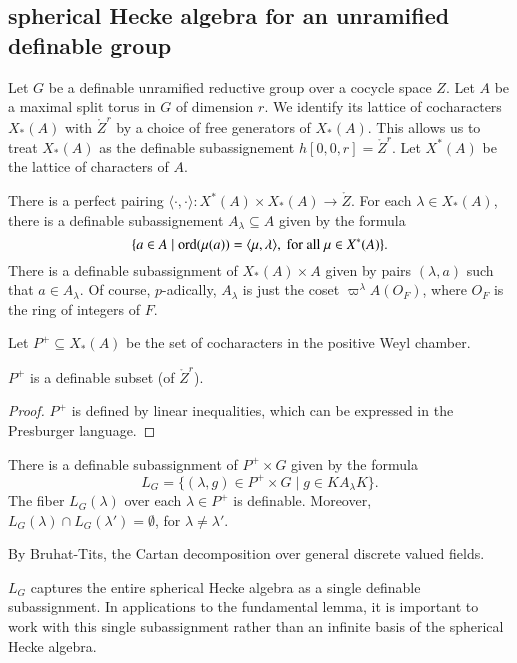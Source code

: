 \subsection{spherical Hecke algebra for an unramified definable group}

Let $G$ be a definable unramified reductive group over a cocycle space
$Z$.  Let $A$ be a maximal split torus in $G$ of dimension $r$.  We
identify its lattice of cocharacters $X_*(A)$ with $\ring{Z}^r$ by a
choice of free generators of $X_*(A)$.  This allows us to treat
$X_*(A)$ as the definable subassignement $h[0,0,r] = \ring{Z}^r$.  Let
$X^*(A)$ be the lattice of characters of $A$.

There is a perfect pairing $\langle\cdot,\cdot\rangle:X^*(A)\times
X_*(A) \to \ring{Z}$.  For each $\lambda\in X_*(A)$, there is a
definable subassignement $A_\lambda \subseteq A$ given by the formula
\[
\{ a \in A \mid {\operatorname{ord}}(\mu(a)) 
= \langle{\mu,\lambda}\rangle,\text{ for all } \mu\in X^*(A) \}.
\]
There is a definable subassignment of $X_*(A)\times A$ given by pairs
$(\lambda,a)$ such that $a\in A_\lambda$.  Of course, $p$-adically,
$A_\lambda$ is just the coset $\varpi^\lambda A(O_F)$, where $O_F$ is
the ring of integers of $F$.

Let $P^+\subseteq X_*(A)$ be the set of cocharacters in the positive
Weyl chamber.

\begin{lemma} 
  $P^+$ is a definable subset (of $\ring{Z}^r$).
\end{lemma}

\begin{proof} 
  $P^+$ is defined by linear inequalities, which can be expressed in
  the Presburger language.
\end{proof}

\begin{lemma} \label{lemma:cartan}
  There is a definable subassignment of $P^+\times G$ given by the
  formula
\[
L_G = \{(\lambda,g)\in P^+\times G \mid g \in K A_\lambda K \}.
\]
The fiber $L_G(\lambda)$ over each $\lambda\in P^+$ is definable.
Moreover, $L_G(\lambda)\cap L_G(\lambda') = \emptyset$, for
$\lambda\ne \lambda'$.
\end{lemma}

By Bruhat-Tits, the Cartan decomposition over general discrete valued
fields.

\begin{remark}   
  $L_G$ captures the entire spherical Hecke algebra as a single
  definable subassignment.  In applications to the fundamental lemma,
  it is important to work with this single subassignment rather than
  an infinite basis of the spherical Hecke algebra.
\end{remark}

